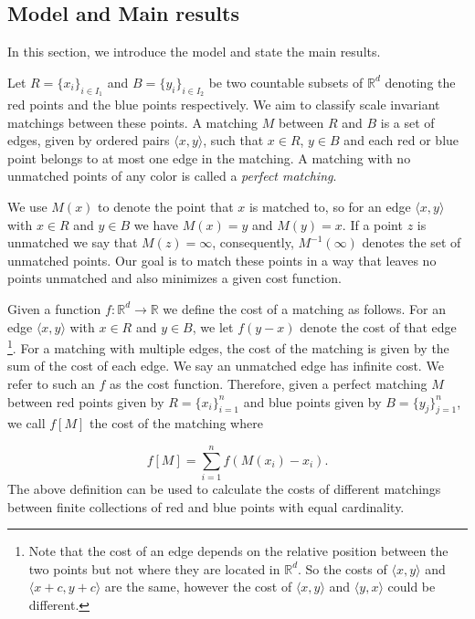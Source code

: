 \documentclass{article}
\newcommand{\R}{\mathbb{R}}
\begin{document}
\subsection{Model and Main results}\label{sec:modelmainresults}

In this section, we introduce the model and  state the
main results.


Let $R=\{x_i\}_{i\in I_1}$ and $B=\{y_i\}_{i\in I_2}$ be two countable subsets of $\mathbb{R}^d$ denoting
the red points and the blue points respectively. We aim to classify
scale invariant
matchings between these points.  A matching $M$ between $R$ and $B$ is a set of edges, given by ordered pairs
  $\langle x,y \rangle$, such that $x\in R$, $y\in B$ and each red or
  blue point belongs to at most one edge in the matching. A matching with no unmatched
  points of any color is called a {\em perfect matching}.

We use $M(x)$ to denote the point that $x$ is matched
to, so for an edge $\langle  x,y \rangle$ with $x\in R$ and $y\in B$ we
have $M(x)=y$ and $M(y)=x$. If a point $z$ is unmatched we say that
$M(z)=\infty$, consequently, $M^{-1}(\infty)$ denotes the set
of unmatched points.  Our goal is to match these points in a way that leaves no
points unmatched and also minimizes a given cost function.


Given a function $f:\R^d\rightarrow \R$ we define the cost
of a matching as follows. For an edge $\langle x,y \rangle$ with
$x\in R$ and $y\in B$, we let $f(y-x)$ denote the cost of that edge
\footnote{ Note that the cost of an edge
depends on the relative position between the two points but not where
they are located in $\R^d$. So the costs of  $\langle x,y \rangle$
and  $\langle x+c,y+c \rangle$ are the same, however the cost of
$\langle x,y \rangle$ and $\langle y,x \rangle$ could be different. }. For a matching with multiple
edges, the cost of the matching is given by the sum of the cost of each
edge. We say an unmatched edge has infinite cost. We  refer to
such an $f$ as the cost function. Therefore, given a perfect matching
$M$
between red points given by
$R=\{x_i\}_{i=1}^n$ and blue points given by $B=\{y_j\}_{j=1}^n$, we call
$f[M]$ the cost of the matching where

  \begin{equation}
   \label{eq:costofamatching}
    f[M] = \sum_{i=1}^n f(M(x_i) - x_i).
  \end{equation}
The above definition can be used to calculate the costs of different matchings
between finite collections of red and blue points with equal cardinality.
\end{document}
